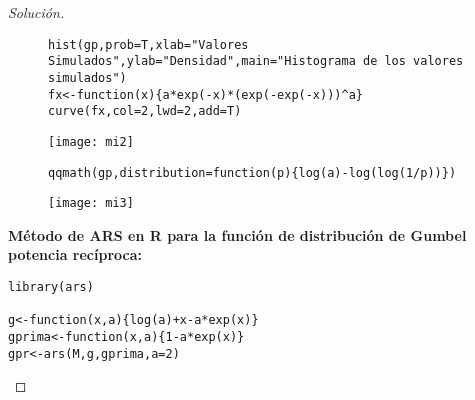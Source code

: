 \documentclass[11pt]{article}
\renewcommand{\=}[1]{\stackrel{#1}{=}} %
\newenvironment{sol}
{\begin{proof}[Solución]}
	{\end{proof}}
\theoremstyle{definition}
\theoremstyle{remark}
\begin{document}
\begin{itemize}
\begin{sol}
\begin{figure}[h]
	\hspace*{0.9cm}\begin{minipage}{10cm}
		{
			\begin{lstlisting}[style=myRstyle, caption={Verificación mediante histograma / GUMBEL POTENCIA.}]
hist(gp,prob=T,xlab="Valores Simulados",ylab="Densidad",main="Histograma de los valores simulados")
fx<-function(x){a*exp(-x)*(exp(-exp(-x)))^a}
curve(fx,col=2,lwd=2,add=T)
			\end{lstlisting}
		}			
	\end{minipage}
	\begin{minipage}{6cm}
		\texttt{[image: mi2]}
	\end{minipage}
\end{figure}
\begin{figure}[h]
	\hspace*{0.9cm}\begin{minipage}{10cm}
		{
			\begin{lstlisting}[style=myRstyle, caption={Verificación mediante gráfica de cuantiles / GUMBEL POTENCIA.}]
qqmath(gp,distribution=function(p){log(a)-log(log(1/p))})
			\end{lstlisting}
		}			
	\end{minipage}
	\begin{minipage}{6cm}
		\texttt{[image: mi3]}
	\end{minipage}
\end{figure}

{\bf Método de ARS en R para la función de distribución de Gumbel potencia recíproca:}
{
	\begin{lstlisting}[style=myRstyle, caption={Algoritmo ARS / GUMBEL POTENCIA RECÍPROCO.}]
library(ars)
	
g<-function(x,a){log(a)+x-a*exp(x)}
gprima<-function(x,a){1-a*exp(x)}
gpr<-ars(M,g,gprima,a=2)
	\end{lstlisting}
}


\end{sol}
\end{itemize}
\end{document}
